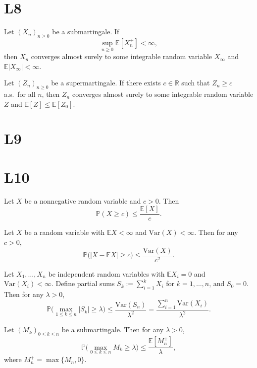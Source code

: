 \documentclass[answers,12pt,addpoints]{exam}
\begin{document}
\section{L8}

\begin{theorem}
Let $(X_n)_{n\ge 0}$ be a submartingale. If
\[
\sup_{n\ge 0} \mathbb{E}[X_n^{+}] < \infty,
\]
then $X_n$ converges almost surely to some integrable random variable $X_\infty$ and $\mathbb{E}|X_\infty|<\infty$.

Let $(Z_n)_{n\ge 0}$ be a supermartingale. If there exists $c\in\mathbb{R}$ such that $Z_n \ge c$ a.s.\ for all $n$, then $Z_n$ converges almost surely to some integrable random variable $Z$ and $\mathbb{E}[Z]\le \mathbb{E}[Z_0]$.
\end{theorem}


\section{L9}

\section{L10}

\begin{theorem}
Let $X$ be a nonnegative random variable and $c>0$. Then
\[
\mathbb{P}(X \ge c) \le \frac{\mathbb{E}[X]}{c}.
\]
\end{theorem}

\begin{theorem}
Let $X$ be a random variable with $\mathbb{E}X<\infty$ and $\mathrm{Var}(X)<\infty$. Then for any $c>0$,
\[
\mathbb{P}\big(|X-\mathbb{E}X|\ge c\big) \le \frac{\mathrm{Var}(X)}{c^2}.
\]
\end{theorem}

\begin{theorem}
Let $X_1,\dots,X_n$ be independent random variables with $\mathbb{E}X_i=0$ and $\mathrm{Var}(X_i)<\infty$. Define partial sums $S_k:=\sum_{i=1}^k X_i$ for $k=1,\dots,n$, and $S_0=0$. Then for any $\lambda>0$,
\[
\mathbb{P}\Big(\max_{1\le k\le n} |S_k|\ge \lambda\Big) \le \frac{\mathrm{Var}(S_n)}{\lambda^2}
= \frac{\sum_{i=1}^n \mathrm{Var}(X_i)}{\lambda^2}.
\]
\end{theorem}

\begin{theorem}
Let $(M_k)_{0\le k\le n}$ be a submartingale. Then for any $\lambda>0$,
\[
\mathbb{P}\Big(\max_{0\le k\le n} M_k \ge \lambda\Big) \le \frac{\mathbb{E}[M_n^{+}]}{\lambda},
\]
where $M_n^{+} = \max\{M_n,0\}$.
\end{theorem}
\end{document}
